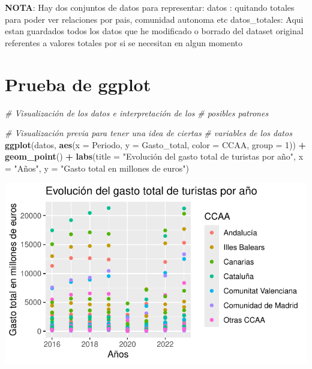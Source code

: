 \documentclass[data,article,submit,moreauthors,pdftex]{Definitions/mdpi}
\newenvironment{Shaded}{\begin{snugshade}}{\end{snugshade}}
\newcommand{\AttributeTok}[1]{\textcolor[rgb]{0.13,0.29,0.53}{#1}}
\newcommand{\CommentTok}[1]{\textcolor[rgb]{0.56,0.35,0.01}{\textit{#1}}}
\newcommand{\DecValTok}[1]{\textcolor[rgb]{0.00,0.00,0.81}{#1}}
\newcommand{\FunctionTok}[1]{\textcolor[rgb]{0.13,0.29,0.53}{\textbf{#1}}}
\newcommand{\NormalTok}[1]{#1}
\newcommand{\SpecialCharTok}[1]{\textcolor[rgb]{0.81,0.36,0.00}{\textbf{#1}}}
\newcommand{\StringTok}[1]{\textcolor[rgb]{0.31,0.60,0.02}{#1}}
\begin{document}
\textbf{NOTA}: Hay dos conjuntos de datos para representar: datos :
quitando totales para poder ver relaciones por pais, comunidad autonoma
etc datos\_totales: Aqui estan guardados todos los datos que he
modificado o borrado del dataset original referentes a valores totales
por si se necesitan en algun momento

\section{Prueba de ggplot}\label{prueba-de-ggplot}

\begin{Shaded}
\begin{Highlighting}[]
\CommentTok{\# Visualización de los datos e interpretación de los}
\CommentTok{\# posibles patrones}

\CommentTok{\# Visualización previa para tener una idea de ciertas}
\CommentTok{\# variables de los datos}
\FunctionTok{ggplot}\NormalTok{(datos, }\FunctionTok{aes}\NormalTok{(}\AttributeTok{x =}\NormalTok{ Periodo, }\AttributeTok{y =}\NormalTok{ Gasto\_total, }\AttributeTok{color =}\NormalTok{ CCAA,}
    \AttributeTok{group =} \DecValTok{1}\NormalTok{)) }\SpecialCharTok{+} \FunctionTok{geom\_point}\NormalTok{() }\SpecialCharTok{+} \FunctionTok{labs}\NormalTok{(}\AttributeTok{title =} \StringTok{"Evolución del gasto total de turistas por año"}\NormalTok{,}
    \AttributeTok{x =} \StringTok{"Años"}\NormalTok{, }\AttributeTok{y =} \StringTok{"Gasto total en millones de euros"}\NormalTok{)}
\end{Highlighting}
\end{Shaded}

\includegraphics{ProyectoAED2024_Rmd_files/figure-latex/unnamed-chunk-21-1.pdf}
\end{document}
